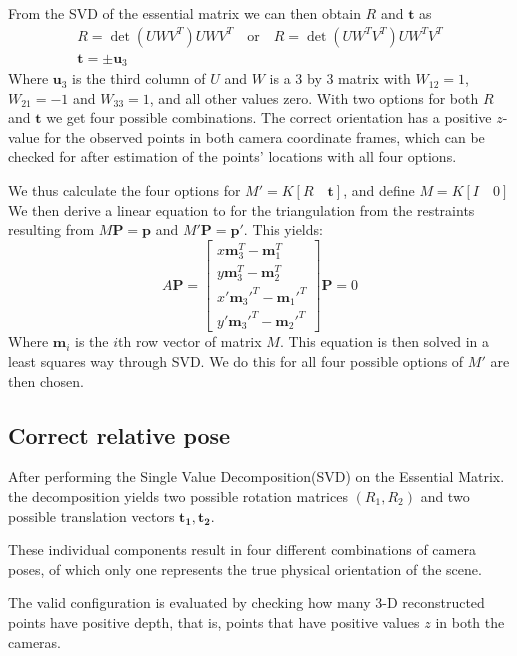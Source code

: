 \documentclass{article}
\begin{document}
From the SVD of the essential matrix we can then obtain $R$ and $\mathbf{t}$ as
\begin{gather*}
    R = \det(UWV^T)UWV^T \quad \mathrm{or} \quad R= \det(UW^TV^T)UW^TV^T \\ 
    \mathbf{t} = \pm \mathbf{u}_3
\end{gather*}
Where $\mathbf{u}_3$ is the third column of $U$ and $W$ is a 3 by 3 matrix with $W_{12} = 1$, $W_{21}=-1$ and $W_{33}=1$, and all other values zero. With two options for both $R$ and $\mathbf{t}$ we get four possible combinations. The correct orientation has a positive $z$-value for the observed points in both camera coordinate frames, which can be checked for after estimation of the points' locations with all four options.

We thus calculate the four options for $M' = K [R\quad \mathbf{t}]$, and define $M = K[I\quad 0]$ We then derive a linear equation to for the triangulation from the restraints resulting from $M\mathbf{P}= \mathbf{p}$ and $M'\mathbf{P} = \mathbf{p}'$. This yields:
\[ A\mathbf{P} =
\begin{bmatrix}
x\mathbf{m}_3^{T} - \mathbf{m}_1^{T} \\
y\mathbf{m}_3^{T} - \mathbf{m}_2^{T} \\
x'\mathbf{m}_3'^{T} - \mathbf{m}_1'^{T} \\
y'\mathbf{m}_3'^{T} - \mathbf{m}_2'^{T}
\end{bmatrix} \mathbf{P} = 0
\]
Where $\mathbf{m}_i$ is the $i$th row vector of matrix $M$. This equation is then solved in a least squares way through SVD. We do this for all four possible options of $M'$ are then chosen.


\subsection{Correct relative pose}

After performing the Single Value Decomposition(SVD) on the Essential Matrix. the decomposition yields two possible rotation matrices $(R_1, R_2)$ and two possible translation vectors $\mathbf{t_1,t_2}$.

These individual components result in four different combinations of camera poses, of which only one represents the true physical orientation of the scene.

The valid configuration is evaluated by checking how many 3-D reconstructed points have positive depth, that is, points that have positive values $z$ in both the cameras. 
\end{document}
